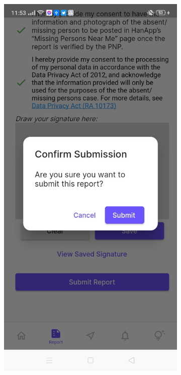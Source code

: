 \begin{figure}[!h]
    \centering
    \begin{subfigure}[c]{0.40\linewidth}
        \centering
        \includegraphics[scale=0.15]{figures/Chapter4/Main/SubmitReport-1.jpg}

\end{subfigure}
\end{figure}
